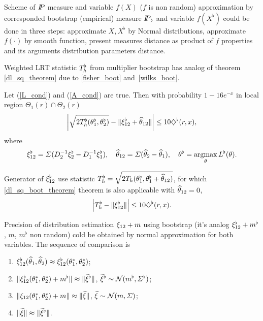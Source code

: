Scheme of $\P$ measure and variable $f(X)$ ($f$ is non random) approximation by corresponded bootstrap (empirical) measure $\Pb$ and variable $f(X^{\flat})$ could be done in three steps: approximate $X, X^{\flat}$ by Normal distributions, approximate $f(\cdot)$ by smooth function, present measures distance as product of $f$ properties and its arguments distribution parameters distance.       




Weighted LRT statistic $\dLhb$ from multiplier bootstrap has analog of theorem \ref{dl_sq_theorem} due to \ref{fisher_boot} and~\ref{wilks_boot}.

\begin{theorem}
\label{dl_sq_boot_theorem}

Let (\ref{L_cond}) and (\ref{A_cond}) are true. Then with probability $1 - 16 e^{-x}$ in local region $\Theta_1(r) \cap \Theta_2(r)$ 
\[
\left| 
\sqrt{ 2 \dLb12 } - 
\Vert  \dxib +  \dthetahat \Vert 
\right| \leq 
10  \rombb,
\]
where
\[
\dxib  = \Sigma (D_2^{-1} \xi_2^{\flat} - D_1^{-1} \xi_1^{\flat}),
\quad
\dthetahat  = \Sigma (\widehat{\theta}_2 - \widehat{\theta}_1),
\quad
 \thetab  = \argmax_{\theta} \Lbf.
\]


\end{theorem}

\begin{remark}
Generator of $\dxib$ use statistic $\dLhb = \sqrt{ 2\dLh (\thetab_1, \thetab_1 + \dthetahat) }$, for which \ref{dl_sq_boot_theorem} theorem is also applicable
with $\dthetahat = 0$, 
\[
\left| 
\dLhb - \Vert  \dxib  \Vert 
\right| \leq 
10  \rombb.
\]
\end{remark}

Precision of distribution estimation    $\dxi + m$ using bootstrap (it's analog $\dxib + m^{\flat}$,  $m$, $m^{\flat}$ non random) cold be obtained by normal approximation for both variables. The sequence of comparison is
\begin{enumerate}
\item $\dxib(\opttheta_1, \opttheta_2) \approx \dxib(\theta_1^*, \theta_2^*)$;
\item  $\Vert \dxib(\theta_1^*, \theta_2^*) + m^{\flat} \Vert  \approx  \Vert \txib \Vert$, $\txib \sim \ND(m^{\flat}, \Sigma^{\flat}) $;
\item  $\Vert  \dxi(\theta_1^*, \theta_2^*) + m \Vert  \approx  \Vert \txi \Vert$, $\txi \sim \ND(m, \Sigma) $;
\item  $\Vert \txi  \Vert  \approx  \Vert \txib \Vert$.
\end{enumerate}


